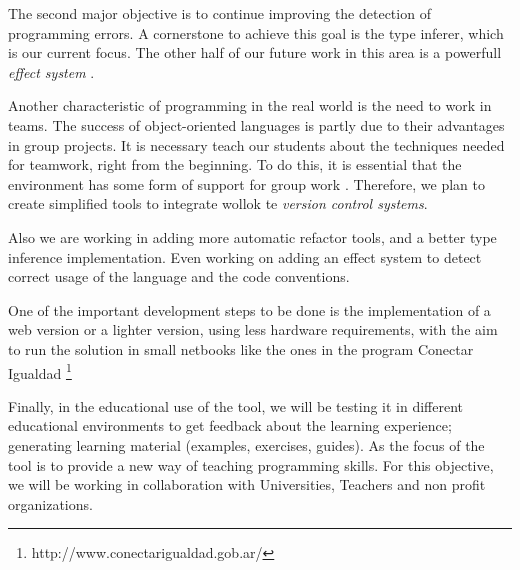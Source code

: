 The second major objective is to continue improving the detection of programming errors.
A cornerstone to achieve this goal is the type inferer, which is our current focus.
The other half of our future work in this area is a powerfull \emph{effect system} \cite{effect system}.

Another characteristic of programming in the real world is the need to work in teams. 
The success of object-oriented languages is partly due to their advantages in group projects. 
It is necessary teach our students about the techniques needed for teamwork, right from the beginning. 
To do this, it is essential that the environment has some form of support for group work \cite{kolling_problem_1999}.
Therefore, we plan to create simplified tools to integrate wollok te \emph{version control systems}.

Also we are working in adding more automatic refactor tools, and a better type inference implementation. Even working on adding an effect system to detect correct usage of the language and the code conventions.

One of the important development steps to be done is the implementation of a web version or a lighter version, using less hardware requirements, with the aim to run the solution in small netbooks like the ones in the program Conectar Igualdad \footnote{http://www.conectarigualdad.gob.ar/}

Finally, in the educational use of the tool, we will be testing it in different educational environments to get feedback about the learning experience; generating learning material (\eg examples, exercises, guides). As the focus of the tool is to provide a new way of teaching programming skills. For this objective, we will be working in collaboration with Universities, Teachers and non profit organizations.
